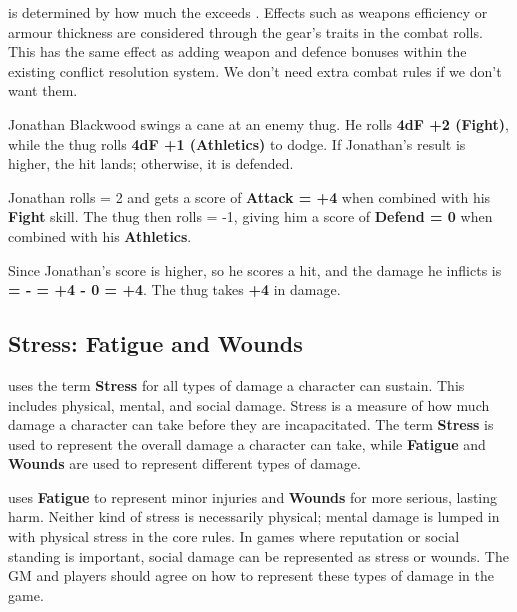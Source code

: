 \begin{multicols}{2}
\Damage is determined by how much the \Attack exceeds \Defend. Effects such as weapons efficiency or armour thickness are considered through the gear's traits in the combat rolls. This has the same effect as adding weapon and defence bonuses within the existing conflict resolution system. We don't need extra combat rules if we don't want them.

\begin{Example}
	Jonathan Blackwood swings a cane at an enemy thug. He rolls \textbf{4dF +2 (Fight)}, while the thug rolls \textbf{4dF +1 (Athletics)} to dodge. If Jonathan’s result is higher, the hit lands; otherwise, it is defended.
	
	Jonathan rolls \FudgeRes{+++-} = 2 and gets a score of \textbf{Attack = +4} when combined with his \textbf{Fight} skill. The thug then rolls  = -1, giving him a score of \textbf{Defend = 0} when combined with his \textbf{Athletics}.
	
	Since Jonathan's score is higher, so he scores a hit, and the damage he inflicts is \textbf{\Damage = \Attack - \Defend = +4 - 0 = +4}. The thug takes \textbf{+4} in damage.
\end{Example}


\subsection{Stress: Fatigue  and Wounds}

\wyrd uses the term \textbf{Stress} for all types of damage a character can sustain. This includes physical, mental, and social damage. Stress is a measure of how much damage a character can take before they are incapacitated. The term \textbf{Stress} is used to represent the overall damage a character can take, while \textbf{Fatigue} and \textbf{Wounds} are used to represent different types of damage.

\wyrd uses \textbf{Fatigue} to represent minor injuries and \textbf{Wounds} for more serious, lasting harm. Neither kind of stress is necessarily physical; mental damage is lumped in with physical stress in the core rules. In games where reputation or social standing is important, social damage can be represented as stress or wounds. The GM and players should agree on how to represent these types of damage in the game.


\end{multicols}
